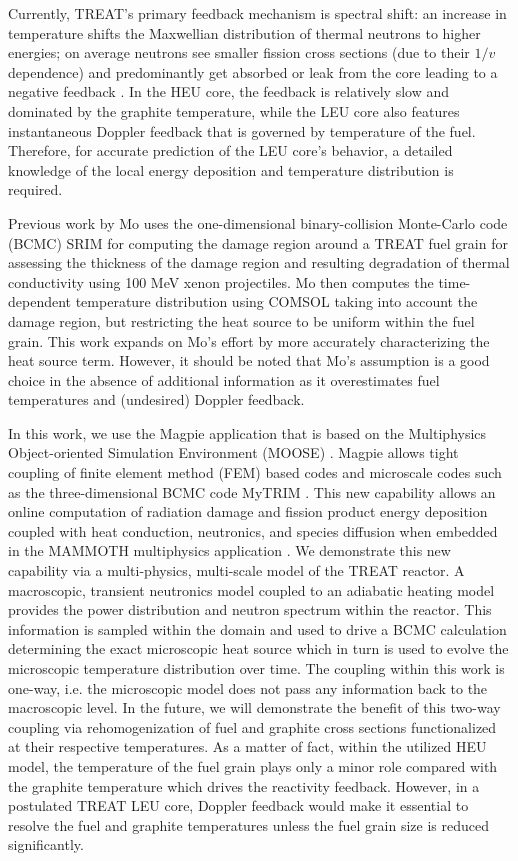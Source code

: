 \documentclass{anstrans}
\begin{document}
Currently, TREAT's primary feedback mechanism is spectral shift: an increase in temperature shifts the Maxwellian distribution of thermal neutrons to higher energies; on average neutrons see smaller fission cross sections (due to their $1/v$ dependence) and predominantly get absorbed or leak from the core leading to a negative feedback \cite{TreatFeedback}. In the HEU core, the feedback is relatively slow and dominated by the graphite temperature, while the LEU core also features instantaneous Doppler feedback that is governed by temperature of the fuel. Therefore, for accurate prediction of the LEU core's behavior, a detailed knowledge of the local energy deposition and temperature distribution is required.

Previous work by Mo \cite{Mo2015} uses the one-dimensional binary-collision Monte-Carlo code (BCMC) SRIM \cite{SRIM} for computing the damage region around a TREAT fuel grain for assessing the thickness of the damage region and resulting degradation of thermal conductivity using 100 MeV xenon projectiles. Mo then computes the time-dependent temperature distribution using COMSOL \cite{COMSOL} taking into account the damage region, but restricting the heat source to be uniform within the fuel grain. This work expands on Mo's effort by more accurately characterizing the heat source term. However, it should be noted that Mo's assumption is a good choice in the absence of additional information as it overestimates fuel temperatures and (undesired) Doppler feedback.

In this work, we use the Magpie application that is based on the Multiphysics Object-oriented Simulation Environment (MOOSE) \cite{Moose}. Magpie allows tight coupling of finite element method (FEM) based codes and microscale codes such as the three-dimensional BCMC code MyTRIM \cite{MyTRIM}. This new capability allows an online computation of radiation damage and fission product energy deposition coupled with heat conduction, neutronics, and species diffusion when embedded in the MAMMOTH multiphysics application \cite{MAMMOTH}. We demonstrate this new capability via a multi-physics, multi-scale model of the TREAT reactor.
A macroscopic, transient neutronics model coupled to an adiabatic heating model provides the power distribution and neutron spectrum within the reactor. This information is sampled within the domain and used to drive a BCMC calculation determining the exact microscopic heat source which in turn is used to evolve the microscopic temperature distribution over time. The coupling within this work is one-way, i.e. the microscopic model does not pass any information back to the macroscopic level. In the future, we will demonstrate the benefit of this two-way coupling via rehomogenization of fuel and graphite cross sections functionalized at their respective temperatures. As a matter of fact, within the utilized HEU model, the temperature of the fuel grain plays only a minor role compared with the graphite temperature which drives the reactivity feedback. However, in a postulated TREAT LEU core, Doppler feedback would make it essential to resolve the fuel and graphite temperatures unless the fuel grain size is reduced significantly.
\end{document}
